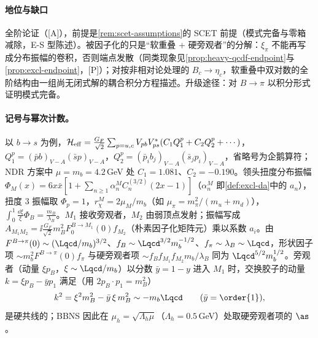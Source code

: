 \paragraph{地位与缺口}
全阶论证（[A]），前提是\cref{rem:scet-assumptions}的 SCET 前提（模式完备与零箱减除，E-S 型陈述）。被因子化的只是“软重叠 + 硬旁观者”的分解：$\xi_\pi$ 不能再写成分布振幅的卷积，否则端点发散（同类现象见\cref{prop:heavy-qcdf-endpoint}与\cref{prop:excl-endpoint}，[P]）；对按非相对论处理的 $B_c\to\eta_c$，软重叠中双对数的全阶结构由一组尚无闭式解的耦合积分方程描述\cite{Bell:2024bxg}。升级途径：对 $B\to\pi$ 以积分形式证明模式完备。

\paragraph{记号与幂次计数。}
以 $b\to s$ 为例，$\mathcal H_{\rm eff}=\frac{G_F}{\sqrt2}\sum_{p=u,c}V_{pb}V_{ps}^*(C_1Q_1^p+C_2Q_2^p+\cdots)$，$Q_1^p=(\bar pb)_{V-A}(\bar sp)_{V-A}$，$Q_2^p=(\bar p_ib_j)_{V-A}(\bar s_jp_i)_{V-A}$，省略号为企鹅算符；NDR 方案中 $\mu=m_b=4.2$\,GeV 处 $C_1=1.081$、$C_2=-0.190$\cite[表~1]{BenekeEtAl2001}。领头扭度分布振幅 $\Phi_M(x)=6x\bar x[1+\sum_{n\ge1}\alpha_n^MC_n^{(3/2)}(2x-1)]$（$\alpha_n^M$ 即\cref{def:excl-da}中的 $a_n$），扭度 3 振幅取 $\Phi_p=1$，$r_\chi^M=2\mu_M/m_b$（如 $\mu_\pi=m_\pi^2/(m_u+m_d)$），$\int_0^1\frac{\dd\xi}{\xi}\Phi_B=\frac{m_B}{\lambda_B}$。$M_1$ 接收旁观者，$M_2$ 由弱顶点发射；振幅写成 $A_{M_1M_2}=\ii\frac{G_F}{\sqrt2}m_B^2F_0^{B\to M_1}(0)f_{M_2}$（朴素因子化矩阵元\cite[式~(11)]{BenekeNeubert2003}）乘以系数 $a_i$。由 $F^{B\to\pi}(0)\sim(\Lqcd/m_b)^{3/2}$、$f_B\sim\Lqcd^{3/2}m_b^{-1/2}$、$f_\pi\sim\lambda_B\sim\Lqcd$，形状因子项 $\sim m_b^2F^{B\to\pi}(0)f_\pi$ 与硬旁观者项 $\sim f_Bf_{M_1}f_{M_2}m_b/\lambda_B$ 同为 $\Lqcd^{5/2}m_b^{1/2}$。旁观者（动量 $\xi p_B$，$\xi\sim\Lqcd/m_b$）以分数 $\bar y=1-y$ 进入 $M_1$ 时，交换胶子的动量 $k=\xi p_B-\bar yp_1$ 满足（用 $2p_B\cdot p_1=m_B^2$）
\begin{equation}\label{eq:heavy-hc-gluon}
k^2=\xi^2m_B^2-\bar y\,\xi\,m_B^2\sim-m_b\Lqcd\qquad(\bar y=\order{1}),
\end{equation}
是硬共线的；BBNS 因此在 $\mu_h=\sqrt{\Lambda_h\mu}$（$\Lambda_h=0.5$\,GeV）处取硬旁观者项的 $\as$\cite{BenekeEtAl2001}。

